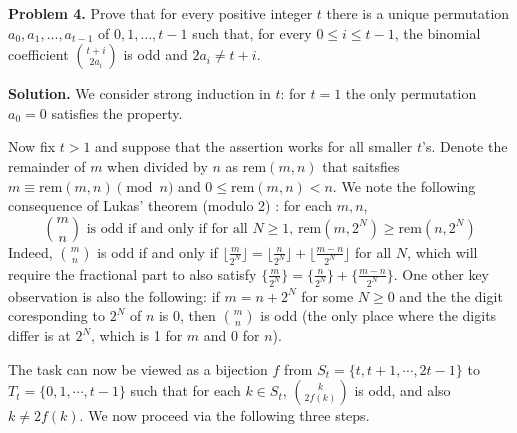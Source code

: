 \documentclass[11pt,a4paper]{article}
\begin{document}
	\textbf{Problem 4.}
	Prove that for every positive integer $t$ there is a unique permutation $a_0, a_1, \ldots , a_{t-1}$ of $0, 1, \ldots , t-1$ such that, for every $0 \leq i \leq t-1$, the binomial coefficient $\binom{t+i}{2a_i}$ is odd and $2a_i \neq t+i$.
	
	\textbf{Solution.} 
	We consider strong induction in $t$: 
	for $t = 1$ the only permutation $a_0 = 0$ satisfies the property. 
	
	Now fix $t > 1$ and suppose that the assertion works for all smaller $t$'s. 
	Denote the remainder of $m$ when divided by $n$ as $\text{rem}(m, n)$ that saitsfies 
	$m\equiv \text{rem}(m, n)\pmod{n}$ and $0\le \text{rem}(m, n) < n$. 
	We note the following consequence of Lukas' theorem (modulo 2) : for each $m, n$, 
	\[
	\binom{m}{n} \text{ is odd if and only if for all $N\ge 1$, } \text{rem}(m, 2^N)\ge \text{rem}(n, 2^N)
	\]
	Indeed, $\binom{m}{n}$ is odd if and only if $\lfloor \frac{m}{2^N}\rfloor = 
	\lfloor \frac{n}{2^N}\rfloor  + \lfloor \frac{m - n}{2^N}\rfloor $ for all $N$, 
	which will require the fractional part to also satisfy 
	$\{ \frac{m}{2^N}\}= 
	\{\frac{n}{2^N}\} + \{ \frac{m - n}{2^N}\}$. 
	One other key observation is also the following: 
	if $m = n + 2^N$ for some $N\ge 0$ and the the digit coresponding to $2^N$ of $n$ is 0, 
	then $\binom{m}{n}$ is odd (the only place where the digits differ is at $2^N$, which is 1 for $m$ and 0 for $n$). 
	
	The task can now be viewed as a bijection $f$ from 
	$S_t = \{t, t + 1, \cdots, 2t - 1\}$ to $T_t = \{0, 1, \cdots, t - 1\}$ such that for each 
	$k \in S_t$, $\binom{k}{2f(k)}$ is odd, and also $k\neq 2f(k)$. 
	We now proceed via the following three steps. 
	
\end{document}
